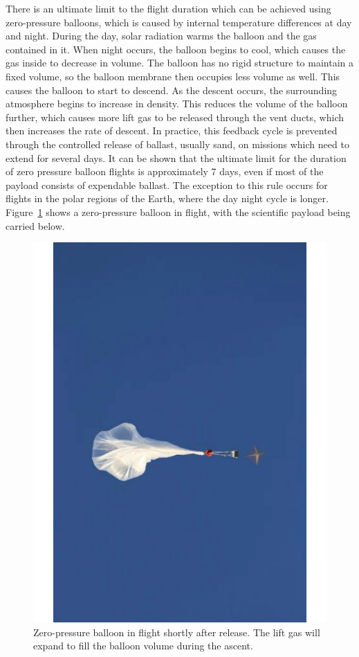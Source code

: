 There is an ultimate limit to the flight duration which can be achieved using zero-pressure balloons, which is caused by internal temperature differences at day and night. During the day, solar radiation warms the balloon and the gas contained in it. When night occurs, the balloon begins to cool, which causes the gas inside to decrease in volume. The balloon has no rigid structure to maintain a fixed volume, so the balloon membrane then occupies less volume as well. This causes the balloon to start to descend. As the descent occurs, the surrounding atmosphere begins to increase in density. This reduces the volume of the balloon further, which causes more lift gas to be released through the vent ducts, which then increases the rate of descent. In practice, this feedback cycle is prevented through the controlled release of ballast, usually sand, on missions which need to extend for several days. It can be shown that the ultimate limit for the duration of zero pressure balloon flights is approximately 7 days, even if most of the payload consists of expendable ballast. The exception to this rule occurs for flights in the polar regions of the Earth, where the day night cycle is longer. Figure~\ref{zero_pressure_balloon_example} shows a zero-pressure balloon in flight, with the scientific payload being carried below.

\begin{figure}[p]
\label{zero_pressure_balloon_example}
\begin{centering}
\includegraphics[width=.7\textwidth,angle=270]{figures/chapter_1/zero_pressure_example/zero_pressure_example}
\caption{Zero-pressure balloon in flight shortly after release. The lift gas will expand to fill the balloon volume during the ascent.}
\end{centering}
\end{figure}
\newpage

